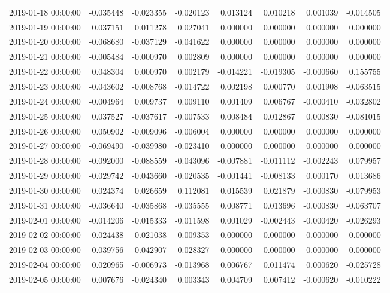 \begin{tabular}{lrrrrrrr}
2019-01-18 00:00:00 & -0.035448 & -0.023355 & -0.020123 & 0.013124 & 0.010218 & 0.001039 & -0.014505 \\
2019-01-19 00:00:00 & 0.037151 & 0.011278 & 0.027041 & 0.000000 & 0.000000 & 0.000000 & 0.000000 \\
2019-01-20 00:00:00 & -0.068680 & -0.037129 & -0.041622 & 0.000000 & 0.000000 & 0.000000 & 0.000000 \\
2019-01-21 00:00:00 & -0.005484 & -0.000970 & 0.002809 & 0.000000 & 0.000000 & 0.000000 & 0.000000 \\
2019-01-22 00:00:00 & 0.048304 & 0.000970 & 0.002179 & -0.014221 & -0.019305 & -0.000660 & 0.155755 \\
2019-01-23 00:00:00 & -0.043602 & -0.008768 & -0.014722 & 0.002198 & 0.000770 & 0.001908 & -0.063515 \\
2019-01-24 00:00:00 & -0.004964 & 0.009737 & 0.009110 & 0.001409 & 0.006767 & -0.000410 & -0.032802 \\
2019-01-25 00:00:00 & 0.037527 & -0.037617 & -0.007533 & 0.008484 & 0.012867 & 0.000830 & -0.081015 \\
2019-01-26 00:00:00 & 0.050902 & -0.009096 & -0.006004 & 0.000000 & 0.000000 & 0.000000 & 0.000000 \\
2019-01-27 00:00:00 & -0.069490 & -0.039980 & -0.023410 & 0.000000 & 0.000000 & 0.000000 & 0.000000 \\
2019-01-28 00:00:00 & -0.092000 & -0.088559 & -0.043096 & -0.007881 & -0.011112 & -0.002243 & 0.079957 \\
2019-01-29 00:00:00 & -0.029742 & -0.043660 & -0.020535 & -0.001441 & -0.008133 & 0.000170 & 0.013686 \\
2019-01-30 00:00:00 & 0.024374 & 0.026659 & 0.112081 & 0.015539 & 0.021879 & -0.000830 & -0.079953 \\
2019-01-31 00:00:00 & -0.036640 & -0.035868 & -0.035555 & 0.008771 & 0.013696 & -0.000830 & -0.063707 \\
2019-02-01 00:00:00 & -0.014206 & -0.015333 & -0.011598 & 0.001029 & -0.002443 & -0.000420 & -0.026293 \\
2019-02-02 00:00:00 & 0.024438 & 0.021038 & 0.009353 & 0.000000 & 0.000000 & 0.000000 & 0.000000 \\
2019-02-03 00:00:00 & -0.039756 & -0.042907 & -0.028327 & 0.000000 & 0.000000 & 0.000000 & 0.000000 \\
2019-02-04 00:00:00 & 0.020965 & -0.006973 & -0.013968 & 0.006767 & 0.011474 & 0.000620 & -0.025728 \\
2019-02-05 00:00:00 & 0.007676 & -0.024340 & 0.003343 & 0.004709 & 0.007412 & -0.000620 & -0.010222 \\

\end{tabular}
